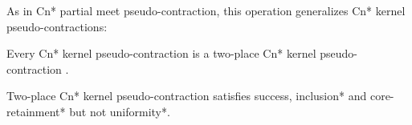 As in \textsf{Cn*} partial meet pseudo-contraction, this operation generalizes \textsf{Cn*} kernel pseudo-contractions:

\begin{proposition}
    Every \textsf{Cn*} kernel pseudo-contraction is a two-place \textsf{Cn*} kernel pseudo-contraction \citep{Santos2018}.
\end{proposition}

Two-place \textsf{Cn*} kernel pseudo-contraction satisfies success, inclusion* and core-retainment* but not uniformity*.
